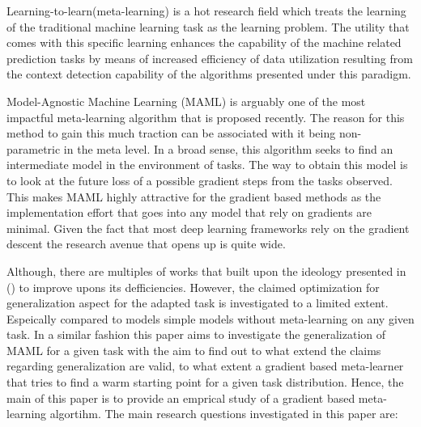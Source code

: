 Learning-to-learn(meta-learning) is a hot research field which treats the learning of the traditional machine learning task as the learning problem. The utility that comes with this specific learning enhances the capability of the machine related prediction tasks by means of increased efficiency of data utilization resulting from the context detection capability of the algorithms presented under this paradigm. 

Model-Agnostic Machine Learning (MAML)\cite{Finn2017} is arguably one of the most impactful meta-learning algorithm that is proposed recently. The reason for this method to gain this much traction can be associated with it being non-parametric in the meta level. In a broad sense, this algorithm seeks to find an intermediate model in the environment of tasks. The way to obtain this model is to look at the future loss of a possible gradient steps from the tasks observed. This makes MAML highly attractive for the gradient based methods as the implementation effort that goes into any model that rely on gradients are minimal. Given the fact that most deep learning frameworks rely on the gradient descent the research avenue that \cite{Finn2017} opens up is quite wide.

Although, there are multiples of works that built upon the ideology presented in \cite{Finn2017} (\eg \cite{Flennerhag2019,Nichol2018,Rajasegaran2020,Collins2020,Guiroy2019a, Antoniou2019}) to improve upons its defficiencies. However, the claimed optimization for generalization \cite{Nichol2018, Finn2017} aspect for the adapted task is investigated to a limited extent. Espeically compared to models simple models without meta-learning on any given task. In a similar fashion this paper aims to investigate the generalization of MAML for a given task with the aim to find out to what extend the claims regarding generalization are valid, to what extent a gradient based meta-learner that tries to find a warm starting point for a given task distribution. Hence, the main of this paper is to provide an emprical study of a gradient based meta-learning algortihm. The main research questions investigated in this paper are:

